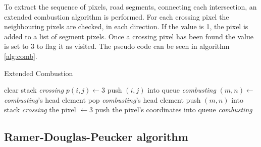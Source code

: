 To extract the sequence of pixels, road segments, connecting each intersection, an extended combustion algorithm is performed. For each crossing pixel the neighbouring pixels are checked, in each direction. If the value is 1, the pixel is added to a list of segment pixels. Once a crossing pixel has been found the value is set to 3 to flag it as visited. The pseudo code can be seen in algorithm \ref{alg:comb}.

\begin{algorithm}[H]
    \caption{Extended Combustion}
    \label{alg:comb}
    \begin{algorithmic}
    
    \State clear stack \textit{crossing}
    \State $p(i,j) \gets 3$
    \State push $(i,j)$ into queue \textit{combusting}
        \State $(m,n) \gets$ \textit{combusting}'s head element
        \State pop \textit{combusting}'s head element
        \State push $(m,n)$ into stack \textit{crossing}
                \State the pixel $\gets 3$
                \State push the pixel's coordinates into queue \textit{combusting}
            \EndIf
        \EndFor
    \EndWhile
    \end{algorithmic}
\end{algorithm}

\subsection{Ramer-Douglas-Peucker algorithm}
\label{chp:theory.sec:dp}

